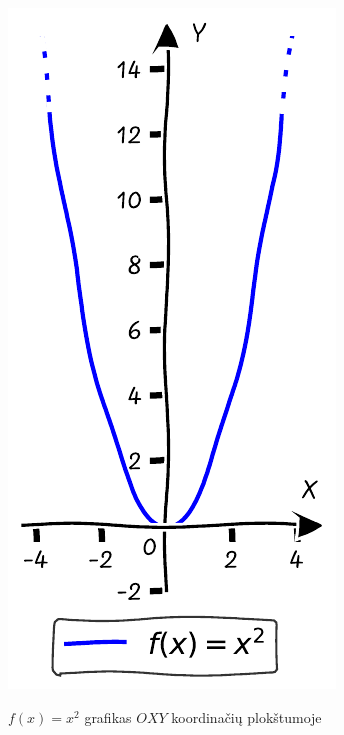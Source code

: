 \documentclass[nobib]{tufte-handout}
\begin{document}
\begin{marginfigure}%

  \includegraphics[width=\linewidth]{./graphs/quadratic_function_plot_example.pdf}
  \caption{$f(x)=x^2$ grafikas $OXY$ koordinačių plokštumoje}
  \label{fig:example_quadratic_plot}
\end{marginfigure}
\end{document}
